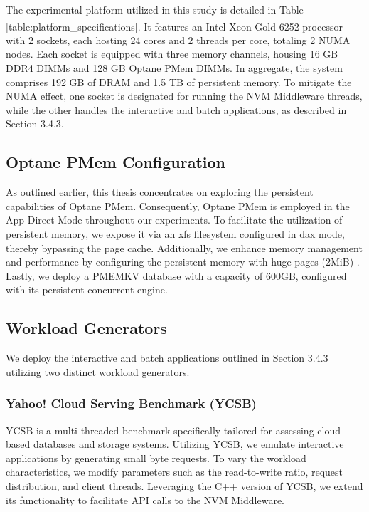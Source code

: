 The experimental platform utilized in this study is detailed in Table \ref{table:platform_specifications}. It features an Intel\textsuperscript{\tiny\textregistered} Xeon\textsuperscript{\tiny\textregistered} Gold 6252 processor with 2 sockets, each hosting 24 cores and 2 threads per core, totaling 2 NUMA nodes. Each socket is equipped with three memory channels, housing 16 GB DDR4 DIMMs and 128 GB Optane PMem DIMMs. In aggregate, the system comprises 192 GB of DRAM and 1.5 TB of persistent memory. To mitigate the NUMA effect, one socket is designated for running the NVM Middleware threads, while the other handles the interactive and batch applications, as described in Section 3.4.3.

\subsection{Optane PMem Configuration}
As outlined earlier, this thesis concentrates on exploring the persistent capabilities of Optane PMem. Consequently, Optane PMem is employed in the App Direct Mode throughout our experiments. To facilitate the utilization of persistent memory, we expose it via an xfs filesystem configured in dax mode, thereby bypassing the page cache. Additionally, we enhance memory management and performance by configuring the persistent memory with huge pages (2MiB) \cite{Speeding28:online}. Lastly, we deploy a PMEMKV database with a capacity of 600GB, configured with its persistent concurrent engine.

\subsection{Workload Generators}

We deploy the interactive and batch applications outlined in Section 3.4.3 utilizing two distinct workload generators.

\subsubsection{Yahoo! Cloud Serving Benchmark (YCSB)}

YCSB \cite{GitHubba9:online} is a multi-threaded benchmark specifically tailored for assessing cloud-based databases and storage systems. Utilizing YCSB, we emulate interactive applications by generating small byte requests. To vary the workload characteristics, we modify parameters such as the read-to-write ratio, request distribution, and client threads. Leveraging the C++ version of YCSB, we extend its functionality to facilitate API calls to the NVM Middleware.

